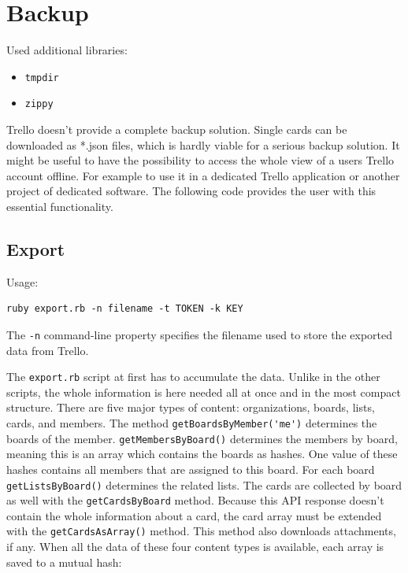 

\section{Backup}

Used additional libraries:
\begin{itemize}
	\item{\texttt{tmpdir}}
	\item{\texttt{zippy}}
\end{itemize}

Trello doesn't provide a complete backup solution. Single cards can be downloaded as *.json files, which is hardly viable for a serious backup solution. It might be useful to have the possibility to access the whole view of a users Trello account offline. For example to use it in a dedicated Trello application or another project of dedicated software. The following code provides the user with this essential functionality.

\subsection{Export}
Usage:
\begin{lstlisting}[aboveskip=1\baselineskip, style=bash, caption=\texttt{export.rb} usage., label=listing037]
ruby export.rb -n filename -t TOKEN -k KEY
\end{lstlisting}

The \texttt{-n} command-line property specifies the filename used to store the exported data from Trello.

The \texttt{export.rb} script at first has to accumulate the data. Unlike in the other scripts, the whole information is here needed all at once and in the most compact structure. There are five major types of content: organizations, boards, lists, cards, and members. The method \lstinline{getBoardsByMember('me')} determines the boards of the member. \lstinline{getMembersByBoard()} determines the members by board, meaning this is an array which contains the boards as hashes. One value of these hashes contains all members that are assigned to this board. For each board \lstinline{getListsByBoard()} determines the related lists. The cards are collected by board as well with the \lstinline{getCardsByBoard} method. Because this API response doesn't contain the whole information about a card, the card array must be extended with the \lstinline{getCardsAsArray()} method. This method also downloads attachments, if any.  When all the data of these four content types is available, each array is saved to a mutual hash:

